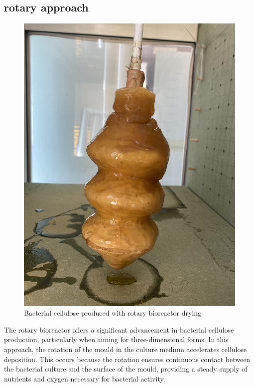 \subsection{rotary approach}


\begin{figure}[h]
    \centering
    \includegraphics{images/IMG_2419.jpg}
    \caption{Bacterial cellulose produced with rotary bioreactor drying}
    \label{fig:rotary inside}
\end{figure} 

The rotary bioreactor offers a significant advancement in bacterial cellulose production, particularly when aiming for three-dimensional forms. In this approach, the rotation of the mould in the culture medium accelerates cellulose deposition. This occurs because the rotation ensures continuous contact between the bacterial culture and the surface of the mould, providing a steady supply of nutrients and oxygen necessary for bacterial activity.

